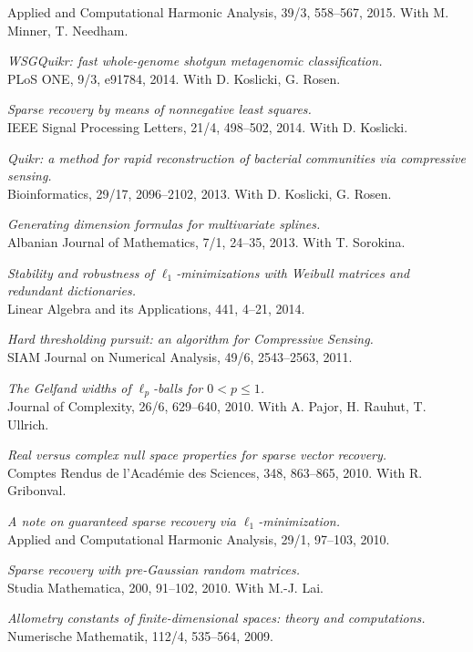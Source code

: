 \documentclass[11pt]{article}
\begin{document}
Applied and Computational Harmonic Analysis, 39/3, 558--567, 2015.
With M. Minner, T. Needham.
\item {\sl WSGQuikr: fast whole-genome shotgun metagenomic classification.}\\
PLoS ONE, 9/3, e91784, 2014. 
With D. Koslicki, G. Rosen.
\item{\sl Sparse recovery by means of nonnegative least squares.}\\
IEEE Signal Processing Letters, 21/4, 498--502, 2014. 
With D. Koslicki.
\item {\sl Quikr: a method for rapid reconstruction of bacterial communities via compressive sensing.}\\
Bioinformatics, 29/17, 2096--2102, 2013. 
With D. Koslicki, G. Rosen.
\item {\sl Generating dimension formulas for multivariate splines.}\\
Albanian Journal of Mathematics, 7/1, 24--35, 2013.
 With T. Sorokina.
\item {\sl Stability and robustness of $\ell_1$-minimizations with Weibull matrices and redundant dictionaries.}\\
Linear Algebra and its Applications, 441, 4--21, 2014.
\item {\sl Hard thresholding pursuit: an algorithm for Compressive Sensing.}\\
SIAM Journal on Numerical Analysis, 49/6, 2543--2563, 2011.
\item {\sl The Gelfand widths of $\ell_p$-balls for $0<p \le 1$.}\\
Journal of Complexity, 26/6, 629--640, 2010. 
With A. Pajor, H. Rauhut, T. Ullrich.
\item {\sl Real versus complex null space properties for sparse vector recovery.}\\
Comptes Rendus de l'Acad\'emie des Sciences, 348, 863--865, 2010. 
With R. Gribonval.
\item {\sl A note on guaranteed sparse recovery via $\ell_1$-minimization.}\\
Applied and Computational Harmonic Analysis, 29/1, 97--103, 2010.
\item {\sl Sparse recovery with pre-Gaussian random matrices.}\\
Studia Mathematica, 200, 91--102, 2010. 
With M.-J. Lai.
\item {\sl Allometry constants of finite-dimensional spaces: theory and computations.}\\
Numerische Mathematik,  112/4, 535--564, 2009.
\end{document}
